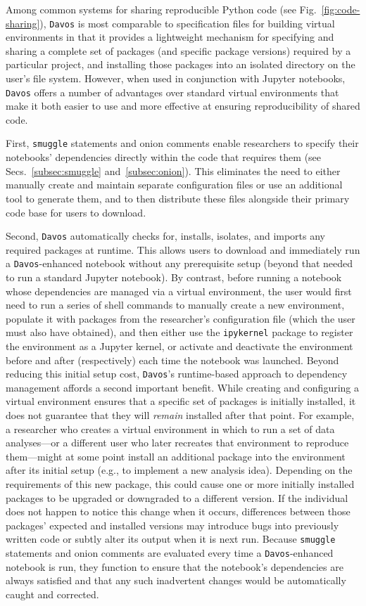 \documentclass[preprint,12pt,a4paper]{elsarticle}
\begin{document}
Among common systems for sharing reproducible Python code (see Fig.~\ref{fig:code-sharing}), \texttt{Davos} is most comparable to specification files for building virtual environments in that it provides a lightweight mechanism for specifying and sharing a complete set of packages (and specific package versions) required by a particular project, and installing those packages into an isolated directory on the user's file system.
However, when used in conjunction with Jupyter notebooks, \texttt{Davos} offers a number of advantages over standard virtual environments that make it both easier to use and more effective at ensuring reproducibility of shared code.

First, \texttt{smuggle} statements and onion comments enable researchers to specify their notebooks' dependencies directly within the code that requires them (see Secs.~\ref{subsec:smuggle} and~\ref{subsec:onion}).
This eliminates the need to either manually create and maintain separate configuration files or use an additional tool to generate them, and to then distribute these files alongside their primary code base for users to download.

Second, \texttt{Davos} automatically checks for, installs, isolates, and imports any required packages at runtime.
This allows users to download and immediately run a \texttt{Davos}-enhanced notebook without any prerequisite setup (beyond that needed to run a standard Jupyter notebook).
By contrast, before running a notebook whose dependencies are managed via a virtual environment, the user would first need to run a series of shell commands to manually create a new environment, populate it with packages from the researcher's configuration file (which the user must also have obtained), and then either use the \texttt{ipykernel} package to register the environment as a Jupyter kernel, or activate and deactivate the environment before and after (respectively) each time the notebook was launched.
Beyond reducing this initial setup cost, \texttt{Davos}'s runtime-based approach to dependency management affords a second important benefit.
While creating and configuring a virtual environment ensures that a specific set of packages is initially installed, it does not guarantee that they will \textit{remain} installed after that point.
For example, a researcher who creates a virtual environment in which to run a set of data analyses---or a different user who later recreates that environment to reproduce them---might at some point install an additional package into the environment after its initial setup (e.g., to implement a new analysis idea).
Depending on the requirements of this new package, this could cause one or more initially installed packages to be upgraded or downgraded to a different version.
If the individual does not happen to notice this change when it occurs, differences between those packages' expected and installed versions may introduce bugs into previously written code or subtly alter its output when it is next run.
Because \texttt{smuggle} statements and onion comments are evaluated every time a \texttt{Davos}-enhanced notebook is run, they function to ensure that the notebook's dependencies are always satisfied and that any such inadvertent changes would be automatically caught and corrected.
\end{document}
